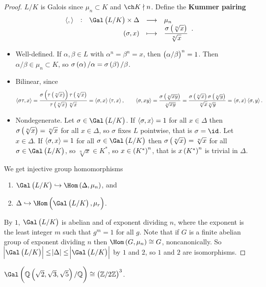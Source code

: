 \begin{proof}
$ L / K $ is Galois since $ \mu_n \subset K $ and $ \ch K \nmid n $. Define the \textbf{Kummer pairing}
$$ \function[\abr{,}]{\Gal\br{L / K} \times \Delta}{\mu_n}{\br{\sigma, x}}{\dfrac{\sigma\br{\sqrt[n]{x}}}{\sqrt[n]{x}}}. $$
\begin{itemize}
\item Well-defined. If $ \alpha, \beta \in L $ with $ \alpha^n = \beta^n = x $, then $ \br{\alpha / \beta}^n = 1 $. Then $ \alpha / \beta \in \mu_n \subset K $, so $ \sigma\br{\alpha} / \alpha = \sigma\br{\beta} / \beta $.
\item Bilinear, since
$$ \abr{\sigma\tau, x} = \dfrac{\sigma\br{\tau\br{\sqrt[n]{x}}}\tau\br{\sqrt[n]{x}}}{\tau\br{\sqrt[n]{x}}\sqrt[n]{x}} = \abr{\sigma, x}\abr{\tau, x}, \qquad \abr{\sigma, xy} = \dfrac{\sigma\br{\sqrt[n]{xy}}}{\sqrt[n]{xy}} = \dfrac{\sigma\br{\sqrt[n]{x}}\sigma\br{\sqrt[n]{y}}}{\sqrt[n]{x}\sqrt[n]{y}} = \abr{\sigma, x}\abr{\sigma, y}. $$
\item Nondegenerate. Let $ \sigma \in \Gal\br{L / K} $. If $ \left\langle \sigma, x \right\rangle = 1 $ for all $ x \in \Delta $ then $ \sigma\br{\sqrt[n]{x}} = \sqrt[n]{x} $ for all $ x \in \Delta $, so $ \sigma $ fixes $ L $ pointwise, that is $ \sigma = \id $. Let $ x \in \Delta $. If $ \left\langle \sigma, x \right\rangle = 1 $ for all $ \sigma \in \Gal\br{L / K} $ then $ \sigma\br{\sqrt[n]{x}} = \sqrt[n]{x} $ for all $ \sigma \in \Gal\br{L / K} $, so $ \sqrt[n]{x} \in K^* $, so $ x \in \br{K^*}^n $, that is $ x\br{K^*}^n $ is trivial in $ \Delta $.
\end{itemize}
We get injective group homomorphisms
\begin{enumerate}
\item $ \Gal\br{L / K} \hookrightarrow \Hom\br{\Delta, \mu_n} $, and
\item $ \Delta \hookrightarrow \Hom\br{\Gal\br{L / K}, \mu_r} $.
\end{enumerate}
By $ 1 $, $ \Gal\br{L / K} $ is abelian and of exponent dividing $ n $, where the exponent is the least integer $ m $ such that $ g^m = 1 $ for all $ g $. Note that if $ G $ is a finite abelian group of exponent dividing $ n $ then $ \Hom\br{G, \mu_n} \cong G $, noncanonically. So $ \abs{\Gal\br{L / K}} \le \abs{\Delta} \le \abs{\Gal\br{L / K}} $ by $ 1 $ and $ 2 $, so $ 1 $ and $ 2 $ are isomorphisms.
\end{proof}

\begin{example*}
$ \Gal\br{\QQ\br{\sqrt{2}, \sqrt{3}, \sqrt{5}} / \QQ} \cong \br{\ZZ / 2\ZZ}^3 $.
\end{example*}


